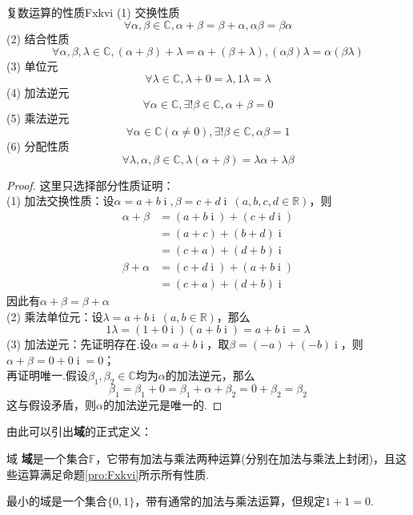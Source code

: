 \documentclass[lang=cn, zihao=5]{elegantbook}
\newcommand{\R}{\mathbb{R}}
\newcommand{\C}{\mathbb{C}}
\newcommand{\F}{\mathbb{F}}
\DeclareMathOperator{\ic}{i}
\begin{document}
\begin{proposition}{复数运算的性质}{Fxkvi}
	(1) 交换性质$$\forall \alpha , \beta \in \C , \alpha + \beta = \beta + \alpha , \alpha \beta = \beta \alpha$$
	(2) 结合性质$$\forall \alpha , \beta , \lambda \in \C , (\alpha + \beta) + \lambda = \alpha + (\beta + \lambda) , (\alpha \beta) \lambda = \alpha (\beta \lambda)$$
	(3) 单位元$$\forall \lambda \in \C , \lambda + 0 = \lambda , 1 \lambda = \lambda$$
	(4) 加法逆元$$\forall \alpha \in \C , \exists ! \beta \in \C , \alpha + \beta = 0$$
	(5) 乘法逆元$$\forall \alpha \in \C (\alpha \neq 0) , \exists ! \beta \in \C , \alpha \beta = 1$$
	(6) 分配性质$$\forall \lambda , \alpha , \beta \in \C , \lambda (\alpha + \beta) = \lambda \alpha + \lambda \beta$$
\end{proposition}
\begin{proof}
	这里只选择部分性质证明： \\
	(1) 加法交换性质：设$\alpha = a+b\ic , \beta = c+d\ic ~(a,b,c,d \in \R )$，则
	\begin{align*}
		\alpha + \beta &= (a+b\ic ) + (c+d\ic ) \\
		&= (a+c) + (b+d)\ic \\
		&= (c+a) + (d+b)\ic \\
		\beta + \alpha &= (c+d\ic ) + (a+b\ic ) \\
		&= (c+a) + (d+b)\ic
	\end{align*}
	因此有$\alpha + \beta = \beta + \alpha$ \\
	(2) 乘法单位元：设$\lambda = a+b\ic ~ (a,b \in \R )$，那么$$1 \lambda = (1+0\ic )(a+b\ic ) = a + b\ic = \lambda$$
	(3) 加法逆元：先证明存在.设$\alpha = a+b\ic $，取$\beta = (-a) + (-b)\ic $，则$\alpha + \beta = 0+0\ic = 0$；\\
	再证明唯一.假设$\beta _1, \beta _2 \in \C $均为$\alpha$的加法逆元，那么$$\beta _1 = \beta _1 + 0 = \beta _1 + \alpha + \beta _2 = 0 + \beta _2 = \beta _2$$
	这与假设矛盾，则$\alpha$的加法逆元是唯一的.
\end{proof}

由此可以引出\textbf{域}的正式定义：

\begin{definition}{域}
	\textbf{域}是一个集合$\F$，它带有加法与乘法两种运算(分别在加法与乘法上封闭)，且这些运算满足命题\ref{pro:Fxkvi}所示所有性质.
\end{definition}
\begin{remark}
	最小的域是一个集合$\{ 0,1 \}$，带有通常的加法与乘法运算，但规定$1+1=0$.
\end{remark}
\end{document}
